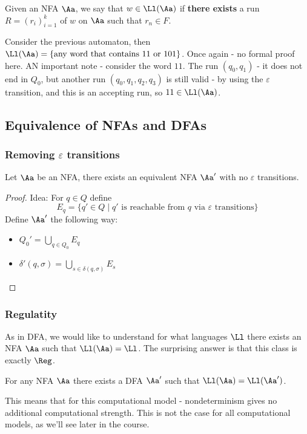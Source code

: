 \begin{yellowBox}
	\begin{defn}
		Given an NFA $\Aa$, we say that $w\in \Ll(\Aa)$ if \textbf{there exists} a run $R = (r_i)_{i=1}^k$ of $w$ on $\Aa$ such that $r_n\in F$.
	\end{defn}
\end{yellowBox}
\begin{example}
	Consider the previous automaton, then $\Ll(\Aa) = \{\text{any word that contains $11$ or $101$}\}$. Once again - no formal proof here. AN important note - consider the word $11$. The run $(q_0,q_1)$ - it does not end in $Q_0$, but another run $(q_0,q_1,q_2,q_3)$ is still valid - by using the $\varepsilon$ transition, and this is an accepting run, so $11\in \Ll(\Aa)$.
\end{example}
\subsection{Equivalence of NFAs and DFAs}
\subsubsection*{Removing $\varepsilon$ transitions}
\begin{claim}
	Let $\Aa$ be an NFA, there exists an equivalent NFA $\Aa'$ with no $\varepsilon$ transitions.
\end{claim}
\begin{proof}
	Idea: For $q\in Q$ define 
	$$E_q = \{q'\in Q \mid \text{$q'$ is reachable from $q$ via $\varepsilon$ transitions}\}$$
	Define $\Aa'$ the following way:
	\begin{itemize}
		\item $Q_0' = \bigcup_{q\in Q_0}E_q$
		\item $\delta'(q,\sigma) = \bigcup_{s\in \delta(q,\sigma)}E_s$
	\end{itemize}
\end{proof}
\subsubsection*{Regulatity} 
As in DFA, we would like to understand for what languages $\Ll$ there exists an NFA $\Aa$ such that $\Ll(\Aa) = \Ll$. The surprising answer is that this class is exactly $\Reg$.
\begin{blueBox}
	\begin{thm}
		For any NFA $\Aa$ there exists a DFA $\Aa'$ such that $\Ll(\Aa) = \Ll(\Aa')$.
	\end{thm}
\end{blueBox}
\begin{remark}
	This means that for this computational model - nondeterminism gives no additional computational strength. This is not the case for all computational models, as we'll see later in the course.
\end{remark}

